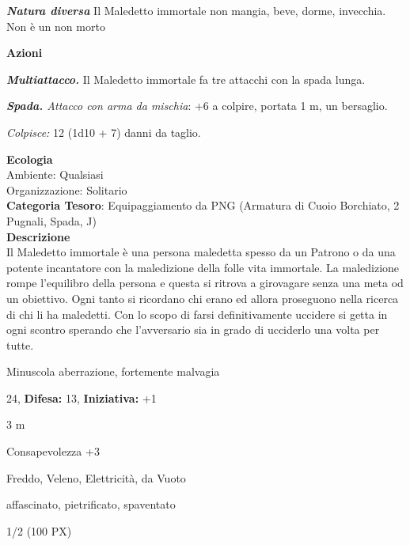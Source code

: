 \begin{multicols}{2}
{\emph{\textbf{Natura diversa}} Il Maledetto immortale non mangia, beve, dorme, invecchia. Non è un non morto

\textbf{Azioni}

\emph{\textbf{Multiattacco.}} Il Maledetto immortale fa tre attacchi con la spada lunga.

\emph{\textbf{Spada.} Attacco con arma da mischia}: +6 a colpire, portata 1 m, un bersaglio.

\emph{Colpisce:} 12 (1d10 + 7) danni da taglio.

\textbf{Ecologia}\\
Ambiente: Qualsiasi\\
Organizzazione: Solitario\\
\textbf{Categoria Tesoro}: Equipaggiamento da PNG (Armatura di Cuoio Borchiato, 2 Pugnali, Spada, J)\\
\textbf{Descrizione}\\
Il Maledetto immortale è una persona maledetta spesso da un Patrono o da una potente incantatore con la maledizione della folle vita immortale. La maledizione rompe l'equilibro della persona e questa si ritrova a girovagare senza una meta od un obiettivo. Ogni tanto si ricordano chi erano ed allora proseguono nella ricerca di chi li ha maledetti.
Con lo scopo di farsi definitivamente uccidere si getta in ogni scontro sperando che l'avversario sia in grado di ucciderlo una volta per tutte.

\label{moneteaffamate}
\noindent
\begin{description}[noitemsep, topsep=0pt, parsep=0pt, partopsep=0pt, leftmargin=0cm, labelwidth=2.2cm]
	\item[\textbf{Taglia/Tipo:}] Minuscola aberrazione, fortemente malvagia
	\item[\textbf{Caratt.:}] 
	\item[\textbf{Punti Ferita:}] 24,  \textbf{Difesa:} 13,  \textbf{Iniziativa:} +1
	\item[\textbf{Movimento:}] 3 m
	\item[\textbf{Tiri Salvez.:}] 
	\item[\textbf{Comp.:}] Consapevolezza +3
	\item[\textbf{Imm. Danni:}] Freddo, Veleno, Elettricità, da Vuoto
	\item[\textbf{Immunità:}] affascinato, pietrificato, spaventato
	\item[\textbf{Sfida:}] 1/2 (100 PX)\smallskip
\end{description}

}
\end{multicols}
